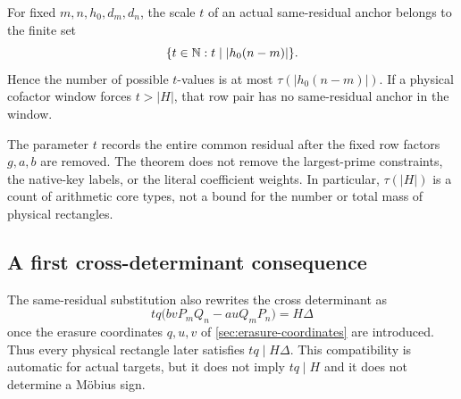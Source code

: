 \begin{corollary}
\label{cor:divisor-many-anchor-cores}
For fixed \(m,n,h_0,d_m,d_n\), the scale \(t\) of an actual
same-residual anchor belongs to the finite set
\[
 \{t\in\mathbb N:t\mid |h_0(n-m)|\}.
\]
Hence the number of possible \(t\)-values is at most
\(\tau(|h_0(n-m)|)\).  If a physical cofactor window forces
\(t>|H|\), that row pair has no same-residual anchor in the window.
\end{corollary}

\begin{remark}
\label{rem:anchor-compression-scope}
The parameter \(t\) records the entire common residual after the fixed
row factors \(g,a,b\) are removed.  The theorem does not remove the
largest-prime constraints, the native-key labels, or the literal
coefficient weights.  In particular, \(\tau(|H|)\) is a count of
arithmetic core types, not a bound for the number or total mass of
physical rectangles.
\end{remark}

\subsection{A first cross-determinant consequence}

The same-residual substitution also rewrites the cross determinant as
\begin{equation}
 tq\bigl(bvP_mQ_n-auQ_mP_n\bigr)=H\Delta
 \label{eq:primitive-cross-determinant-preview}
\end{equation}
once the erasure coordinates \(q,u,v\) of
\cref{sec:erasure-coordinates} are introduced.  Thus every physical
rectangle later satisfies \(tq\mid H\Delta\).  This compatibility is
automatic for actual targets, but it does not imply \(tq\mid H\) and it
does not determine a M\"obius sign.
